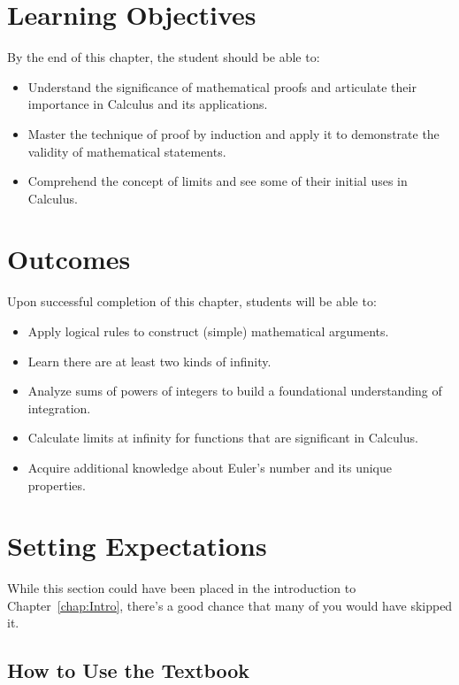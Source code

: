 \section*{Learning Objectives}
By the end of this chapter, the student should be able to:
\begin{itemize}
    \item Understand the significance of mathematical proofs and articulate their importance in Calculus and its applications.
    \item Master the technique of proof by induction and apply it to demonstrate the validity of mathematical statements.
    \item Comprehend the concept of limits and see some of their initial uses in Calculus.
\end{itemize}


\section*{Outcomes}
Upon successful completion of this chapter, students will be able to:
\begin{itemize}
    \item Apply logical rules to construct (simple) mathematical arguments.
    \item  Learn there are at least two kinds of infinity.
    \item Analyze sums of powers of integers to build a foundational understanding of integration.
    \item Calculate limits at infinity for functions that are significant in Calculus.
    \item Acquire additional knowledge about Euler's number and its unique properties.
\end{itemize}

\newpage

\section{Setting Expectations}

While this section could have been placed in the introduction to Chapter~\ref{chap:Intro}, there's a good chance that many of you would have skipped it. 

\subsection{How to Use the Textbook}

